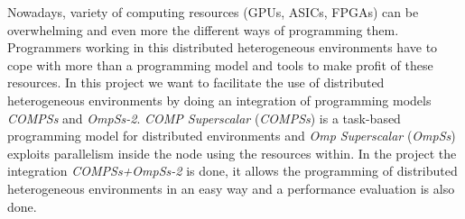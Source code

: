 Nowadays, variety of computing resources (GPUs, ASICs, FPGAs) can be overwhelming and even more the different ways of programming them. Programmers working in this  distributed heterogeneous environments have to cope with more than a programming model and tools to make profit of these resources. In this project we want to facilitate the use of distributed heterogeneous environments by doing an integration of programming models \textit{COMPSs} and \textit{OmpSs-2}. \textit{COMP Superscalar} (\textit{COMPSs}) is a task-based programming model for distributed environments and \textit{Omp Superscalar} (\textit{OmpSs}) exploits parallelism inside the node using the resources within. In the project the integration \textit{COMPSs+OmpSs-2} is done, it allows the programming of distributed heterogeneous environments in an easy way and a performance evaluation is also done.